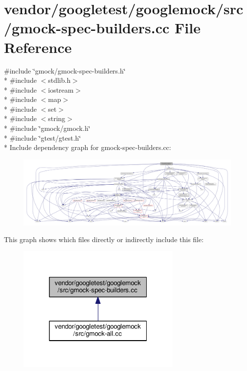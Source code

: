 \hypertarget{gmock-spec-builders_8cc}{}\section{vendor/googletest/googlemock/src/gmock-\/spec-\/builders.cc File Reference}
\label{gmock-spec-builders_8cc}
{\ttfamily \#include \char`\"{}gmock/gmock-\/spec-\/builders.\+h\char`\"{}}\\*
{\ttfamily \#include $<$stdlib.\+h$>$}\\*
{\ttfamily \#include $<$iostream$>$}\\*
{\ttfamily \#include $<$map$>$}\\*
{\ttfamily \#include $<$set$>$}\\*
{\ttfamily \#include $<$string$>$}\\*
{\ttfamily \#include \char`\"{}gmock/gmock.\+h\char`\"{}}\\*
{\ttfamily \#include \char`\"{}gtest/gtest.\+h\char`\"{}}\\*
Include dependency graph for gmock-\/spec-\/builders.cc\+:\nopagebreak
\begin{figure}[H]
\begin{center}
\leavevmode
\includegraphics[width=350pt]{gmock-spec-builders_8cc__incl}
\end{center}
\end{figure}
This graph shows which files directly or indirectly include this file\+:\nopagebreak
\begin{figure}[H]
\begin{center}
\leavevmode
\includegraphics[width=229pt]{gmock-spec-builders_8cc__dep__incl}
\end{center}
\end{figure}
